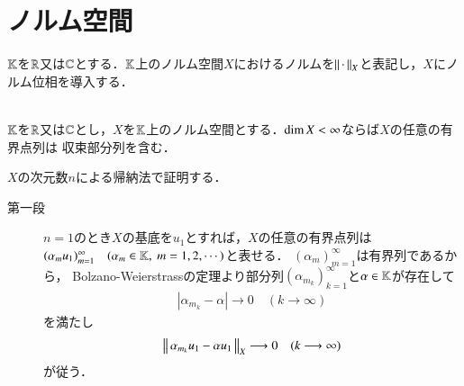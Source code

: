 \chapter{ノルム空間}
	$\mathbb{K}$を$\mathbb{R}$又は$\mathbb{C}$とする．$\mathbb{K}$上のノルム空間$X$におけるノルムを$\left\|\, \cdot\, \right\|_{X}$と表記し，$X$にノルム位相を導入する．
	\begin{screen}
		\begin{thm}\mbox{}\\
			$\mathbb{K}$を$\mathbb{R}$又は$\mathbb{C}$とし，$X$を$\mathbb{K}$上のノルム空間とする．$\operatorname{dim} X < \infty$ならば$X$の任意の有界点列は
			収束部分列を含む．
			\label{thm:normed_space_locally_compact}
		\end{thm}
	\end{screen}

	\begin{prf}\mbox{}
		$X$の次元数$n$による帰納法で証明する．
		\begin{description}
			\item[第一段]
				$n=1$のとき$X$の基底を$u_1$とすれば，$X$の任意の有界点列は
				$( \alpha_m u_1)_{m=1}^{\infty} \quad (\alpha_m \in \mathbb{K},\ m=1,2,\cdots)$と表せる．
				$\left( \alpha_m \right)_{m=1}^{\infty}$は有界列であるから，
				Bolzano-Weierstrassの定理より部分列$\left( \alpha_{m_k} \right)_{k=1}^{\infty}$と$\alpha \in \mathbb{K}$が存在して
				\begin{align}
					\left| \alpha_{m_k} - \alpha \right| \longrightarrow 0 \quad (k \longrightarrow \infty)
				\end{align}
				を満たし
				\begin{align}
					\left\|\, \alpha_{m_k} u_1 - \alpha u_1\, \right\|_{X} \longrightarrow 0 \quad (k \longrightarrow \infty)
				\end{align}
				が従う．
			

\end{description}
\end{prf}
